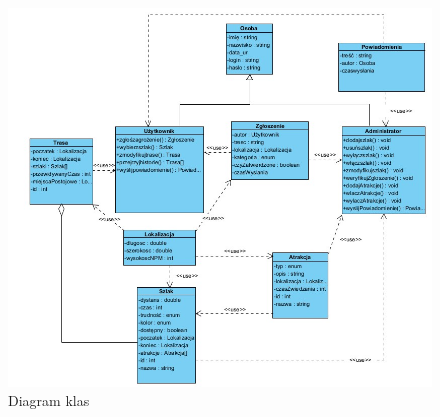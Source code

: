     \begin{figure}[H]
        \centering
        \includegraphics[width=\linewidth]{img/diagramy/klasyyy.jpg}
        \caption{Diagram klas}
        \label{klasy}
    \end{figure}
